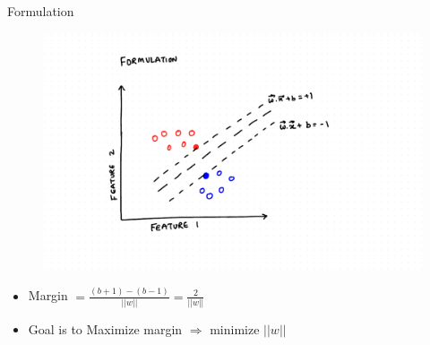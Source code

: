 \documentclass{beamer}
\begin{document}
\begin{frame}{Formulation}

\begin{figure}
\includegraphics[scale=0.3]{SVM/Svm-20.pdf}
\end{figure}

\begin{itemize}
\item Margin $ = \frac{(b+1)-(b-1)}{||w||} = \frac{2}{||w||}$\
\item Goal is to Maximize margin $\Rightarrow$ minimize $||w||$

\end{itemize}

\end{frame}
\end{document}
